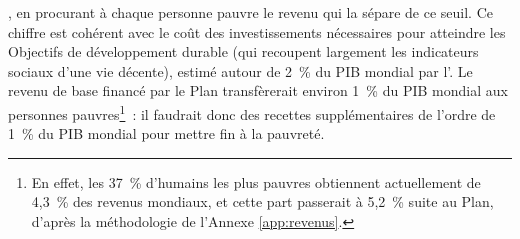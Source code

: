 \documentclass[a5paper,french,openany]{memoir}
\begin{document}
, en procurant à chaque personne pauvre le revenu qui la sépare de ce seuil. Ce chiffre est cohérent avec le coût des investissements nécessaires pour atteindre les Objectifs de développement durable (qui recoupent largement les indicateurs sociaux d'une vie décente), estimé autour de 2~\% du PIB mondial par l'\cite{unctad_estimating_2021}. %
Le revenu de base financé par le Plan transfèrerait environ 1~\% du PIB mondial aux personnes pauvres\footnote{En effet, les 37~\% d'humains les plus pauvres obtiennent actuellement de 4,3~\% des revenus mondiaux, et cette part passerait à 5,2~\% suite au Plan, d'après la méthodologie de l'Annexe \ref{app:revenus}.}~: %
il faudrait donc des recettes supplémentaires de l'ordre de 1~\% du PIB mondial pour mettre fin à la pauvreté. %
\end{document}
